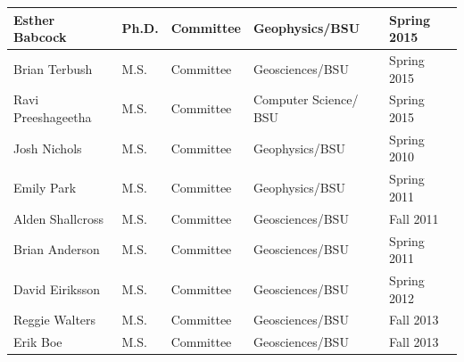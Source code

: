 \documentclass[11pt]{article}
\begin{document}
\begin{table}[!htbp]
\begin{tabular}{|l|l|l|l|l|}
Esther Babcock & Ph.D. & Committee & Geophysics/BSU & Spring 2015 \\ \hline
Brian Terbush & M.S. & Committee & Geosciences/BSU & Spring 2015 \\ \hline
Ravi Preeshageetha & M.S. & Committee & Computer Science/ BSU & Spring 2015 \\ \hline
Josh Nichols & M.S. & Committee & Geophysics/BSU & Spring 2010 \\ \hline
Emily Park & M.S. & Committee & Geophysics/BSU & Spring 2011 \\ \hline
Alden Shallcross & M.S. & Committee & Geosciences/BSU & Fall 2011 \\ \hline
Brian Anderson & M.S. & Committee & Geosciences/BSU & Spring 2011 \\ \hline
David Eiriksson & M.S. & Committee & Geosciences/BSU & Spring 2012 \\ \hline
Reggie Walters & M.S. & Committee & Geosciences/BSU & Fall 2013 \\ \hline
Erik Boe & M.S. & Committee & Geosciences/BSU & Fall 2013 \\ \hline
\end{tabular}
\end{table}

\pagebreak
\end{document}
